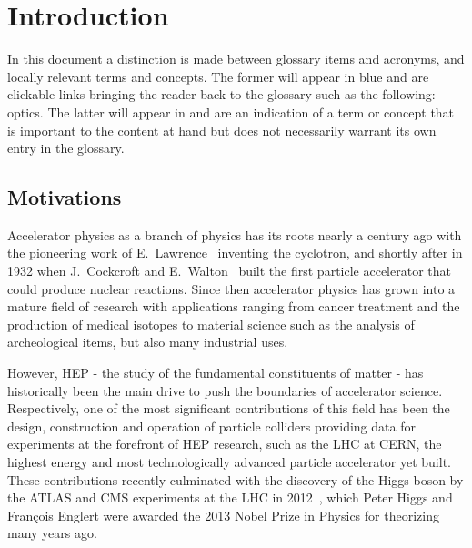 \chapter{Introduction}
\label{chapter:introduction}

\begin{noteblock}
    In this document a distinction is made between glossary items and acronyms, and locally relevant terms and concepts.
    The former will appear in \textcolor{cern}{blue} and are clickable links bringing the reader back to the glossary such as the following: \gls{optics}.
    The latter will appear in  and are an indication of a term or concept that is important to the content at hand but does not necessarily warrant its own entry in the glossary.
\end{noteblock}

\section{Motivations}

Accelerator physics as a branch of physics has its roots nearly a century ago with the pioneering work of E.~Lawrence~\cite{PR:Lawrence:Production_High_Speed_Light_Ions} inventing the cyclotron, and shortly after in \num{1932} when J.~Cockcroft and E.~Walton~\cite{LLC:Cockcroft:Disintegration_Lithium_Swift_Protons,TRS:Cockcroft:Experiments_High_Velocity_Positive_Ions_1,TRS:Cockcroft:Experiments_High_Velocity_Positive_Ions_2} built the first particle accelerator that could produce nuclear reactions.
Since then accelerator physics has grown into a mature field of research with applications ranging from cancer treatment and the production of medical isotopes to material science such as the analysis of archeological items, but also many industrial uses.

However, \gls{HEP} - the study of the fundamental constituents of matter - has historically been the main drive to push the boundaries of accelerator science.
Respectively, one of the most significant contributions of this field has been the design, construction and operation of particle colliders providing data for experiments at the forefront of \gls{HEP} research, such as the \gls{LHC} at \acrshort{CERN}, the highest energy and most technologically advanced particle accelerator yet built.
These contributions recently culminated with the discovery of the Higgs boson by the \acrshort{ATLAS} and \acrshort{CMS} experiments at the \acrshort{LHC} in \num{2012}~\cite{PLB:ATLAS:Observation_Higgs_Boson, PLB:CMS:Observation_Higgs_Boson}, which Peter Higgs and François Englert were awarded the \num{2013} Nobel Prize in Physics for theorizing many years ago.

